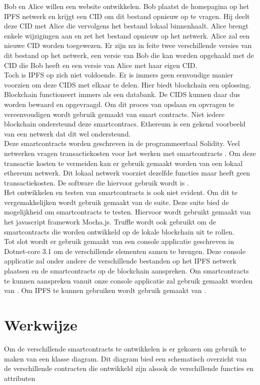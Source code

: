 Bob en Alice willen een website ontwikkelen. Bob plaatst de homepagina op het IPFS netwerk en krijgt een CID om dit bestand opnieuw op te vragen. Hij deelt deze CID met Alice die vervolgens het bestand lokaal binnenhaalt. Alice brengt enkele wijzigingen aan en zet het bestand opnieuw op het netwerk. Alice zal een nieuwe CID worden toegewezen. Er zijn nu in feite twee verschillende versies van dit bestand op het netwerk, een versie van Bob die kan worden opgehaald met de CID die Bob heeft en een versie van Alice met haar eigen CID.\\

Toch is IPFS op zich niet voldoende. Er is immers geen eenvoudige manier voorzien om deze CIDS met elkaar te delen. Hier biedt blockchain een oplossing. Blockchain functioneert immers als een databank. De CIDS kunnen daar dus worden bewaard en opgevraagd. Om dit proces van opslaan en opvragen te vereenvoudigen wordt gebruik gemaakt van smart contracts. Niet iedere blockchain ondersteund deze smartcontracs. Ethereum is een gekend voorbeeld van een netwerk dat dit wel ondersteund.\\

Deze smartcontracts worden geschreven in de programmeertaal Solidity. Veel netwerken vragen transactiekosten voor het werken met smartcontracts . Om deze transactie kosten te vermeiden kan er gebruik gemaakt worden van een lokaal ethereum netwerk. Dit lokaal netwerk voorziet dezelfde functies maar heeft geen transactiekosten. De software die hiervoor gebruik wordt is \textcite{Ganache}.\\

Het ontwikkelen en testen van smartcontracts is ook niet evident. Om dit te vergemakkelijken wordt gebruik gemaakt van de \textcite{Truffle} suite. Deze suite bied de mogelijkheid om smartcontracts te testen. Hiervoor wordt gebruikt gemaakt van het javascript framework Mocha.js. Truffle wordt ook gebruikt om de smartcontracts die worden ontwikkeld op de lokale blockchain uit te rollen.\\

Tot slot wordt er gebruik gemaakt van een console applicatie geschreven in Dotnet-core 3.1 om de verschillende elementen samen te brengen. Deze console applicatie zal onder andere de verschillende bestanden op het IPFS netwerk plaatsen en de smartcontracts op de blockchain aanspreken. Om smartcontracts te kunnen aanspreken vanuit onze console applicatie zal gebruik gemaakt worden van \textcite{Nethereum}. Om IPFS te kunnen gebruiken wordt gebruik gemaakt van \textcite{IPFSClient}.\\

\section{Werkwijze}
Om de verschillende smartcontracts te ontwikkelen is er gekozen om gebruik te maken van een klasse diagram. Dit diagram bied een schematisch overzicht van de verschillende contracten die ontwikkeld zijn alsook de verschillende functies en attributen